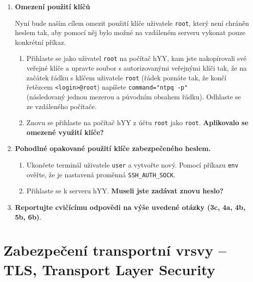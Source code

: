 \documentclass[a4paper,11pt]{article}
\begin{document}
\begin{enumerate}
\begin{enumerate}
    \end{enumerate}

  \item {\bf Omezení použití klíčů}

    Nyní bude naším cílem omezit použití klíče uživatele {\tt root}, který není chráněn heslem tak,
    aby pomocí něj bylo možné na vzdáleném serveru vykonat pouze konkrétní příkaz.

    \begin{enumerate}

      \item Přihlaste se jako uživatel {\tt root} na počítač hYY, kam jste nakopírovali své veřejné klíče a
        upravte soubor s autorizovanými veřejnými klíči tak, že na začátek
        řádku s klíčem uživatele {\tt root} (řádek poznáte tak, že končí řetězcem
        {\tt <login>@root}) napíšete
        \verb|command="ntpq -p" | \\ (následovaný jednou mezerou a původním
        obsahem řádku).
        Odhlaste se ze vzdáleného počítače.

      \item Znovu se přihlaste na počítač hYY z
        účtu {\tt root} jako {\tt root}.  {\bf Aplikovalo se
        omezené využití klíče?}

    \end{enumerate}


  \item {\bf Pohodlné opakované použití klíče zabezpečeného heslem.}

    \begin{enumerate}

      \item Ukončete terminál uživatele {\tt user} a vytvořte nový. Pomocí
        příkazu \verb|env| ověřte, že je nastavená proměnná
        \verb|SSH_AUTH_SOCK|.

      \item Přihlaste se k serveru hYY. {\bf Museli jste zadávat znovu heslo?}

    \end{enumerate}
  \item {\bf Reportujte cvičícímu odpovědi na výše uvedené otázky (3c, 4a, 4b,
    5b, 6b)}.

\end{enumerate}

\section{Zabezpečení transportní vrsvy -- TLS, Transport Layer Security}
\end{document}
